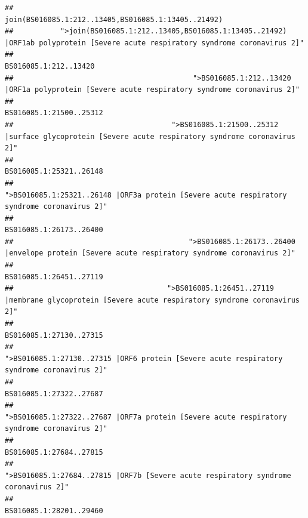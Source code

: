 \documentclass[
]{article}
\begin{document}
\begin{verbatim}
##                                                                                    join(BS016085.1:212..13405,BS016085.1:13405..21492) 
##           ">join(BS016085.1:212..13405,BS016085.1:13405..21492) |ORF1ab polyprotein [Severe acute respiratory syndrome coronavirus 2]" 
##                                                                                                                  BS016085.1:212..13420 
##                                          ">BS016085.1:212..13420 |ORF1a polyprotein [Severe acute respiratory syndrome coronavirus 2]" 
##                                                                                                                BS016085.1:21500..25312 
##                                     ">BS016085.1:21500..25312 |surface glycoprotein [Severe acute respiratory syndrome coronavirus 2]" 
##                                                                                                                BS016085.1:25321..26148 
##                                            ">BS016085.1:25321..26148 |ORF3a protein [Severe acute respiratory syndrome coronavirus 2]" 
##                                                                                                                BS016085.1:26173..26400 
##                                         ">BS016085.1:26173..26400 |envelope protein [Severe acute respiratory syndrome coronavirus 2]" 
##                                                                                                                BS016085.1:26451..27119 
##                                    ">BS016085.1:26451..27119 |membrane glycoprotein [Severe acute respiratory syndrome coronavirus 2]" 
##                                                                                                                BS016085.1:27130..27315 
##                                             ">BS016085.1:27130..27315 |ORF6 protein [Severe acute respiratory syndrome coronavirus 2]" 
##                                                                                                                BS016085.1:27322..27687 
##                                            ">BS016085.1:27322..27687 |ORF7a protein [Severe acute respiratory syndrome coronavirus 2]" 
##                                                                                                                BS016085.1:27684..27815 
##                                                    ">BS016085.1:27684..27815 |ORF7b [Severe acute respiratory syndrome coronavirus 2]" 
##                                                                                                                BS016085.1:28201..29460 

\end{verbatim}
\end{document}
